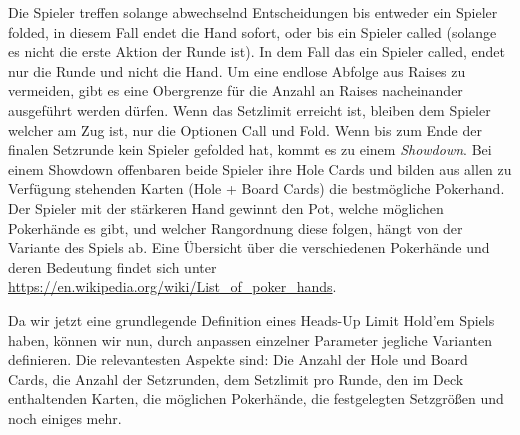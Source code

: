 Die Spieler treffen solange abwechselnd Entscheidungen bis entweder ein Spieler folded, in diesem Fall endet die Hand sofort, oder bis ein Spieler called (solange es nicht die erste Aktion der Runde ist).
In dem Fall das ein Spieler called, endet nur die Runde und nicht die Hand.
Um eine endlose Abfolge aus Raises zu vermeiden, gibt es eine Obergrenze für die Anzahl an Raises nacheinander ausgeführt werden dürfen.
Wenn das Setzlimit erreicht ist, bleiben dem Spieler welcher am Zug ist, nur die Optionen Call und Fold.
Wenn bis zum Ende der finalen Setzrunde kein Spieler gefolded hat, kommt es zu einem \emph{Showdown}.
Bei einem Showdown offenbaren beide Spieler ihre Hole Cards und bilden aus allen zu Verfügung stehenden Karten (Hole + Board Cards) die bestmögliche Pokerhand.
Der Spieler mit der stärkeren Hand gewinnt den Pot, welche möglichen Pokerhände es gibt, und welcher Rangordnung diese folgen, hängt von der Variante des Spiels ab.
Eine Übersicht über die verschiedenen Pokerhände und deren Bedeutung findet sich unter \url{https://en.wikipedia.org/wiki/List_of_poker_hands}.
\cite{southey2005bayes}

Da wir jetzt eine grundlegende Definition eines Heads-Up Limit Hold'em Spiels haben, können wir nun, durch anpassen einzelner Parameter jegliche Varianten definieren.
Die relevantesten Aspekte sind: Die Anzahl der Hole und Board Cards, die Anzahl der Setzrunden, dem Setzlimit pro Runde, den im Deck enthaltenden Karten, die möglichen Pokerhände, die festgelegten Setzgrößen und noch einiges mehr.








